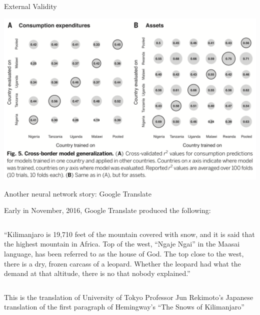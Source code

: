 \documentclass[mathserif, aspectratio=169]{beamer}
\begin{document}
\begin{frame}
\begin{columns}[c]
	\end{columns}
\end{frame}

\begin{frame}{External Validity}

\includegraphics[height = \textheight]{cross-border}

\end{frame}


\begin{frame}{Another neural network story: Google Translate}

Early in November, 2016, Google Translate produced the following:\\

\vspace{5mm}
\begin{columns}


	``Kilimanjaro is 19,710 feet of the mountain covered with snow, and it is said that the highest mountain in Africa. Top of the west, “Ngaje Ngai” in the Maasai language, has been referred to as the house of God. The top close to the west, there is a dry, frozen carcass of a leopard. Whether the leopard had what the demand at that altitude, there is no that nobody explained.''

	\end{columns}

\vspace{5mm}

This is the translation of University of Tokyo Professor Jun Rekimoto's Japanese translation of the first paragraph of Hemingway's ``The Snows of Kilimanjaro''
\end{frame}
\end{document}
